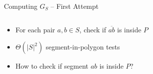 \begin{frame}[t]{Computing $G_S$ -- First Attempt}

\vspace{-2em}
\begin{columns}
\begin{column}{0.6\textwidth}
\begin{itemize}
\item For each pair $a, b \in S$, check if $\overline{ab}$ is inside $P$
\item $\Theta(|S|^2)$ segment-in-polygon tests
\item How to check if segment $ab$ is inside $P$?
\end{itemize}
\end{column}
\begin{column}{0.35\textwidth}
%
\end{column}
\end{columns}

\vspace{-1em}
\begin{center}
\begin{columns}
\begin{column}{0.48\textwidth}
\begin{enumerate}


\end{enumerate}
\end{column}


\end{columns}
\end{center}
\end{frame}
